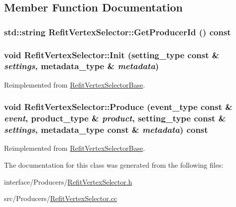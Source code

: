 \subsection{Member Function Documentation}
\hypertarget{classRefitVertexSelector_a2e1b9024235b200be777bbde120574da}{
\subsubsection[{GetProducerId}]{\setlength{\rightskip}{0pt plus 5cm}std::string RefitVertexSelector::GetProducerId () const}}
\label{classRefitVertexSelector_a2e1b9024235b200be777bbde120574da}
\hypertarget{classRefitVertexSelector_a3d8920d82d12c7de736a798b683b6d7f}{
\subsubsection[{Init}]{\setlength{\rightskip}{0pt plus 5cm}void RefitVertexSelector::Init (setting\_\-type const \& {\em settings}, \/  metadata\_\-type \& {\em metadata})}}
\label{classRefitVertexSelector_a3d8920d82d12c7de736a798b683b6d7f}


Reimplemented from \hyperlink{classRefitVertexSelectorBase_aaa721c9601071abe89d6f866d5405c01}{RefitVertexSelectorBase}.\hypertarget{classRefitVertexSelector_a2fa81d07f81c40a39d5dffc4d19e9fb8}{
\subsubsection[{Produce}]{\setlength{\rightskip}{0pt plus 5cm}void RefitVertexSelector::Produce (event\_\-type const \& {\em event}, \/  product\_\-type \& {\em product}, \/  setting\_\-type const \& {\em settings}, \/  metadata\_\-type const \& {\em metadata}) const}}
\label{classRefitVertexSelector_a2fa81d07f81c40a39d5dffc4d19e9fb8}


Reimplemented from \hyperlink{classRefitVertexSelectorBase_a77253bf070f364ed29d8f040a2dd1629}{RefitVertexSelectorBase}.

The documentation for this class was generated from the following files:\begin{DoxyCompactItemize}
\item 
interface/Producers/\hyperlink{RefitVertexSelector_8h}{RefitVertexSelector.h}\item 
src/Producers/\hyperlink{RefitVertexSelector_8cc}{RefitVertexSelector.cc}\end{DoxyCompactItemize}
